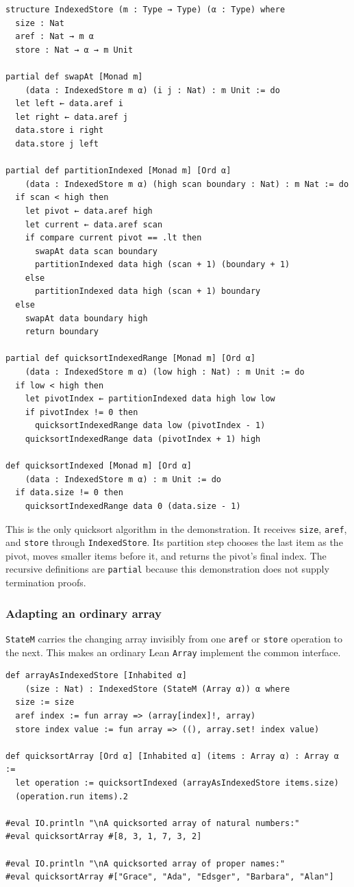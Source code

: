 \documentclass[11pt]{article}
\begin{document}
\begin{verbatim}
structure IndexedStore (m : Type → Type) (α : Type) where
  size : Nat
  aref : Nat → m α
  store : Nat → α → m Unit

partial def swapAt [Monad m]
    (data : IndexedStore m α) (i j : Nat) : m Unit := do
  let left ← data.aref i
  let right ← data.aref j
  data.store i right
  data.store j left

partial def partitionIndexed [Monad m] [Ord α]
    (data : IndexedStore m α) (high scan boundary : Nat) : m Nat := do
  if scan < high then
    let pivot ← data.aref high
    let current ← data.aref scan
    if compare current pivot == .lt then
      swapAt data scan boundary
      partitionIndexed data high (scan + 1) (boundary + 1)
    else
      partitionIndexed data high (scan + 1) boundary
  else
    swapAt data boundary high
    return boundary

partial def quicksortIndexedRange [Monad m] [Ord α]
    (data : IndexedStore m α) (low high : Nat) : m Unit := do
  if low < high then
    let pivotIndex ← partitionIndexed data high low low
    if pivotIndex != 0 then
      quicksortIndexedRange data low (pivotIndex - 1)
    quicksortIndexedRange data (pivotIndex + 1) high

def quicksortIndexed [Monad m] [Ord α]
    (data : IndexedStore m α) : m Unit := do
  if data.size != 0 then
    quicksortIndexedRange data 0 (data.size - 1)
\end{verbatim}

This is the only quicksort algorithm in the demonstration.  It receives
\texttt{size}, \texttt{aref}, and \texttt{store} through \texttt{IndexedStore}.  Its partition step chooses
the last item as the pivot, moves smaller items before it, and returns the
pivot's final index.  The recursive definitions are \texttt{partial} because this
demonstration does not supply termination proofs.
\subsubsection{Adapting an ordinary array}
\label{sec:orgaf5e3aa}

\texttt{StateM} carries the changing array invisibly from one \texttt{aref} or \texttt{store}
operation to the next.  This makes an ordinary Lean \texttt{Array} implement the
common interface.

\begin{verbatim}
def arrayAsIndexedStore [Inhabited α]
    (size : Nat) : IndexedStore (StateM (Array α)) α where
  size := size
  aref index := fun array => (array[index]!, array)
  store index value := fun array => ((), array.set! index value)

def quicksortArray [Ord α] [Inhabited α] (items : Array α) : Array α :=
  let operation := quicksortIndexed (arrayAsIndexedStore items.size)
  (operation.run items).2

#eval IO.println "\nA quicksorted array of natural numbers:"
#eval quicksortArray #[8, 3, 1, 7, 3, 2]

#eval IO.println "\nA quicksorted array of proper names:"
#eval quicksortArray #["Grace", "Ada", "Edsger", "Barbara", "Alan"]
\end{verbatim}
\end{document}
